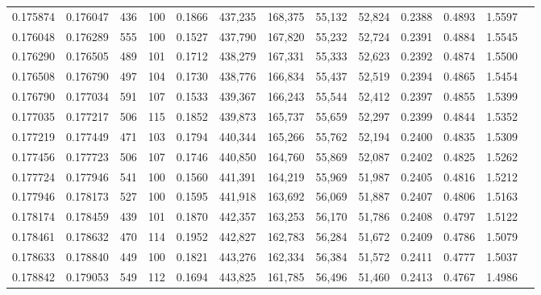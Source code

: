 \begin{tabular}{rrrrrrrrrrrrr}
0.175874 & 0.176047 &   436 & 100 &                                     0.1866 & 437,235 & 168,375 &  55,132 &  52,824 & 0.2388 & 0.4893 & 1.5597 \\
0.176048 & 0.176289 &   555 & 100 &                                     0.1527 & 437,790 & 167,820 &  55,232 &  52,724 & 0.2391 & 0.4884 & 1.5545 \\
0.176290 & 0.176505 &   489 & 101 &                                     0.1712 & 438,279 & 167,331 &  55,333 &  52,623 & 0.2392 & 0.4874 & 1.5500 \\
0.176508 & 0.176790 &   497 & 104 &                                     0.1730 & 438,776 & 166,834 &  55,437 &  52,519 & 0.2394 & 0.4865 & 1.5454 \\
0.176790 & 0.177034 &   591 & 107 &                                     0.1533 & 439,367 & 166,243 &  55,544 &  52,412 & 0.2397 & 0.4855 & 1.5399 \\
0.177035 & 0.177217 &   506 & 115 &                                     0.1852 & 439,873 & 165,737 &  55,659 &  52,297 & 0.2399 & 0.4844 & 1.5352 \\
0.177219 & 0.177449 &   471 & 103 &                                     0.1794 & 440,344 & 165,266 &  55,762 &  52,194 & 0.2400 & 0.4835 & 1.5309 \\
0.177456 & 0.177723 &   506 & 107 &                                     0.1746 & 440,850 & 164,760 &  55,869 &  52,087 & 0.2402 & 0.4825 & 1.5262 \\
0.177724 & 0.177946 &   541 & 100 &                                     0.1560 & 441,391 & 164,219 &  55,969 &  51,987 & 0.2405 & 0.4816 & 1.5212 \\
0.177946 & 0.178173 &   527 & 100 &                                     0.1595 & 441,918 & 163,692 &  56,069 &  51,887 & 0.2407 & 0.4806 & 1.5163 \\
0.178174 & 0.178459 &   439 & 101 &                                     0.1870 & 442,357 & 163,253 &  56,170 &  51,786 & 0.2408 & 0.4797 & 1.5122 \\
0.178461 & 0.178632 &   470 & 114 &                                     0.1952 & 442,827 & 162,783 &  56,284 &  51,672 & 0.2409 & 0.4786 & 1.5079 \\
0.178633 & 0.178840 &   449 & 100 &                                     0.1821 & 443,276 & 162,334 &  56,384 &  51,572 & 0.2411 & 0.4777 & 1.5037 \\
0.178842 & 0.179053 &   549 & 112 &                                     0.1694 & 443,825 & 161,785 &  56,496 &  51,460 & 0.2413 & 0.4767 & 1.4986 \\

\end{tabular}
